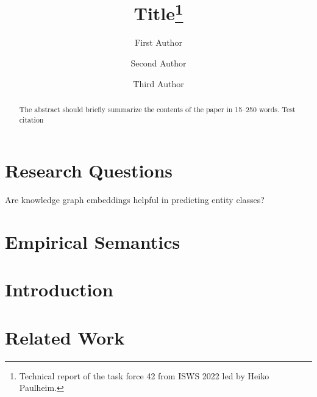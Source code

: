 \documentclass[runningheads]{llncs}
\begin{document}
%
\title{Title\thanks{Technical report of the task force 42 from ISWS 2022 led by Heiko Paulheim.}}

%
%
\author{First Author \and
Second Author \and
Third Author}
%
%
%
\maketitle              %
%
\begin{abstract}
The abstract should briefly summarize the contents of the paper in
15--250 words.  Test citation \cite{Berners-Lee2001}

\end{abstract}

\section{Research Questions}
\label{sec:rq}


Are knowledge graph embeddings helpful in predicting entity classes?


\section{Empirical Semantics}
\label{sec:def}


\section{Introduction}
\label{sec:intro}


\section{Related Work}
\label{sec:related}

\end{document}
